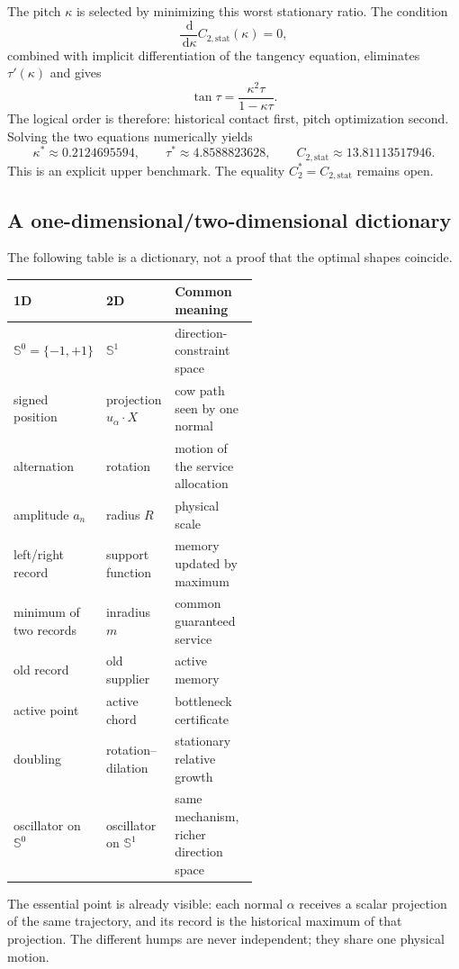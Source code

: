 \documentclass[10pt,a4paper]{article}
\newcommand{\Sph}{\mathbb{S}}
\newcommand{\dd}{\,\mathrm{d}}
\newcommand{\cstar}{C^{*}}
\theoremstyle{plain}
\theoremstyle{definition}
\theoremstyle{remark}
\begin{document}
The pitch $\kappa$ is selected by minimizing this worst stationary ratio. The condition
\[
  \frac{\dd}{\dd\kappa}C_{2,\mathrm{stat}}(\kappa)=0,
\]
combined with implicit differentiation of the tangency equation, eliminates $\tau'(\kappa)$ and gives
\[
  \tan\tau=\frac{\kappa^2\tau}{1-\kappa\tau}.
\]
The logical order is therefore: historical contact first, pitch optimization second. Solving the two equations numerically yields
\[
  \kappa^*\approx0.2124695594,
  \qquad
  \tau^*\approx4.8588823628,
  \qquad
  C_{2,\mathrm{stat}}\approx13.81113517946.
\]
This is an explicit upper benchmark. The equality $\cstar_2=C_{2,\mathrm{stat}}$ remains open.

\subsection{A one-dimensional/two-dimensional dictionary}

The following table is a dictionary, not a proof that the optimal shapes coincide.

\begin{center}
\begin{tabularx}{\linewidth}{@{}p{0.25\linewidth}p{0.29\linewidth}X@{}}
\toprule
\textbf{1D} & \textbf{2D} & \textbf{Common meaning}\\
\midrule
$\Sph^0=\{-1,+1\}$ & $\Sph^1$ & direction-constraint space\\
signed position & projection $u_\alpha\cdot X$ & cow path seen by one normal\\
alternation & rotation & motion of the service allocation\\
amplitude $a_n$ & radius $R$ & physical scale\\
left/right record & support function & memory updated by maximum\\
minimum of two records & inradius $m$ & common guaranteed service\\
old record & old supplier & active memory\\
active point & active chord & bottleneck certificate\\
doubling & rotation--dilation & stationary relative growth\\
oscillator on $\Sph^0$ & oscillator on $\Sph^1$ & same mechanism, richer direction space\\
\bottomrule
\end{tabularx}
\end{center}

The essential point is already visible: each normal $\alpha$ receives a scalar projection of the same trajectory, and its record is the historical maximum of that projection. The different humps are never independent; they share one physical motion.
\end{document}
